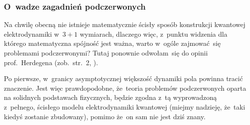 \documentclass[10pt,t]{beamer}
\begin{document}







\begin{frame}
  \frametitle{O~wadze zagadnień podczerwonych}


  Na chwilę obecną nie istnieje matematycznie ścisły sposób konstrukcji
  kwantowej elektrodynamiki w~$3 + 1$ wymiarach, dlaczego więc, z~punktu
  widzenia dla którego matematyczna spójność jest ważna, warto w~ogóle
  zajmować~się problemami podczerwonymi? Tutaj ponownie odwołam~się do
  opinii prof.~Herdegena (zob.~str.~2,
  \parencite{Herdegen-Semidirect-product-of-CCR-and-CAR-algebras-ETC-Pub-1998}).

  Po pierwsze, w~granicy asymptotycznej większość dynamiki pola
  powinna tracić znaczenie. Jest więc prawdopodobne, że~teoria problemów
  podczerwonych oparta na solidnych podstawach fizycznych, będzie zgodna
  z~tą wyprowadzoną z~pełnego, ścisłego modelu elektrodynamiki kwantowej
  (miejmy nadzieję, że~taki kiedyś zostanie zbudowany), pomimo że~on
  sam nie jest dziś znany.

\end{frame}
\end{document}
